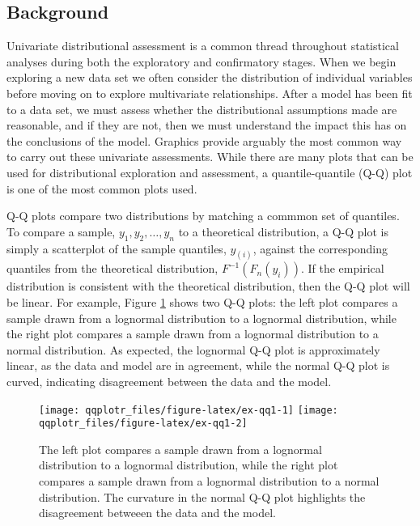 \subsection{Background}\label{background}

\label{sec:background}

Univariate distributional assessment is a common thread throughout
statistical analyses during both the exploratory and confirmatory
stages. When we begin exploring a new data set we often consider the
distribution of individual variables before moving on to explore
multivariate relationships. After a model has been fit to a data set, we
must assess whether the distributional assumptions made are reasonable,
and if they are not, then we must understand the impact this has on the
conclusions of the model. Graphics provide arguably the most common way
to carry out these univariate assessments. While there are many plots
that can be used for distributional exploration and assessment, a
quantile-quantile (Q-Q) plot \citep{Wilk1968-ii} is one of the most
common plots used.

Q-Q plots compare two distributions by matching a commmon set of
quantiles. To compare a sample, \(y_1, y_2, \ldots, y_n\) to a
theoretical distribution, a Q-Q plot is simply a scatterplot of the
sample quantiles, \(y_{(i)}\), against the corresponding quantiles from
the theoretical distribution, \(F^{-1}\left( F_n(y_i) \right)\). If the
empirical distribution is consistent with the theoretical distribution,
then the Q-Q plot will be linear. For example, Figure \ref{fig:ex-qq1}
shows two Q-Q plots: the left plot compares a sample drawn from a
lognormal distribution to a lognormal distribution, while the right plot
compares a sample drawn from a lognormal distribution to a normal
distribution. As expected, the lognormal Q-Q plot is approximately
linear, as the data and model are in agreement, while the normal Q-Q
plot is curved, indicating disagreement between the data and the model.

\begin{Schunk}
\begin{figure}

{\centering \texttt{[image: qqplotr\_files/figure-latex/ex-qq1-1]} \texttt{[image: qqplotr\_files/figure-latex/ex-qq1-2]} 

}

\caption[The left plot compares a sample drawn from a lognormal distribution to a lognormal distribution, while the right plot compares a sample drawn from a lognormal distribution to a normal distribution]{The left plot compares a sample drawn from a lognormal distribution to a lognormal distribution, while the right plot compares a sample drawn from a lognormal distribution to a normal distribution. The curvature in the normal Q-Q plot highlights the disagreement betweeen the data and the model.}\label{fig:ex-qq1}
\end{figure}
\end{Schunk}

